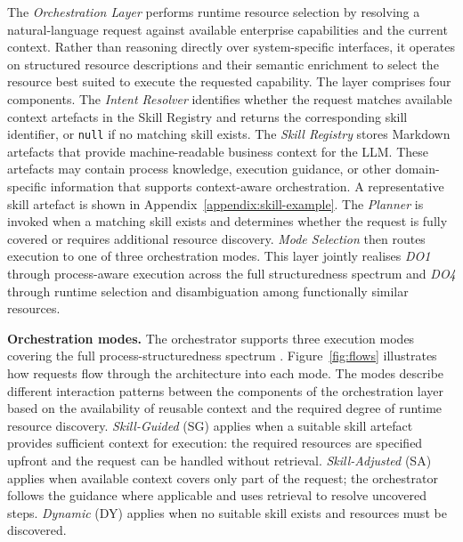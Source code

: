\documentclass[10pt,twocolumn]{article}
\begin{document}
The \emph{Orchestration Layer} performs runtime resource selection by resolving a natural-language request against available enterprise capabilities and the current context. Rather than reasoning directly over system-specific interfaces, it operates on structured resource descriptions and their semantic enrichment to select the resource best suited to execute the requested capability. The layer comprises four components. The \emph{Intent Resolver} identifies whether the request matches available context artefacts in the Skill Registry and returns the corresponding skill identifier, or \texttt{null} if no matching skill exists. The \emph{Skill Registry} stores Markdown artefacts that provide machine-readable business context for the LLM. These artefacts may contain process knowledge, execution guidance, or other domain-specific information that supports context-aware orchestration. A representative skill artefact is shown in Appendix~\ref{appendix:skill-example}. The \emph{Planner} is invoked when a matching skill exists and determines whether the request is fully covered or requires additional resource discovery. \emph{Mode Selection} then routes execution to one of three orchestration modes. This layer jointly realises \textit{DO1} through process-aware execution across the full structuredness spectrum and \textit{DO4} through runtime selection and disambiguation among functionally similar resources.

\textbf{Orchestration modes.} The orchestrator supports three execution modes covering the full process-structuredness spectrum \citep{van_der_aalst_business_2013,di_ciccio_knowledge-intensive_2015}. Figure~\ref{fig:flows} illustrates how requests flow through the architecture into each mode. The modes describe different interaction patterns between the components of the orchestration layer based on the availability of reusable context and the required degree of runtime resource discovery. \emph{Skill-Guided} (SG) applies when a suitable skill artefact provides sufficient context for execution: the required resources are specified upfront and the request can be handled without retrieval. \emph{Skill-Adjusted} (SA) applies when available context covers only part of the request; the orchestrator follows the guidance where applicable and uses retrieval to resolve uncovered steps. \emph{Dynamic} (DY) applies when no suitable skill exists and resources must be discovered.
\end{document}
